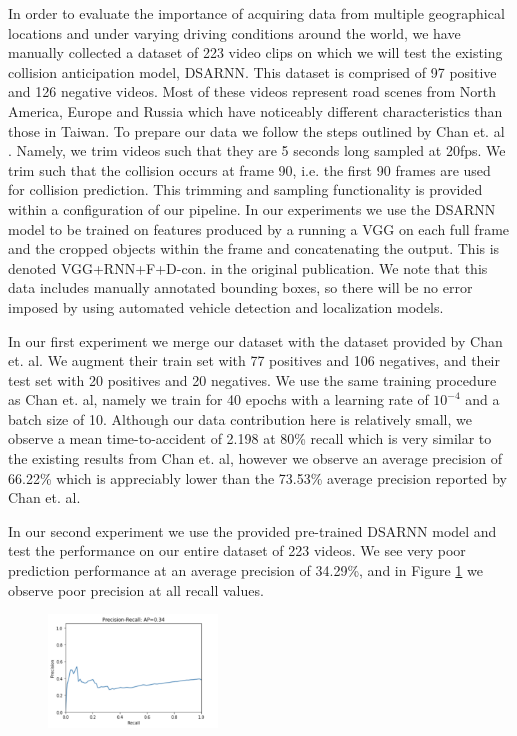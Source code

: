 \documentclass[letterpaper, 10 pt, conference]{IEEEconf}
\begin{document}
In order to evaluate the importance of acquiring data from multiple geographical locations and under varying driving conditions around the world, we have manually collected a dataset of 223 video clips on which we will test the existing collision anticipation model, DSARNN.  This dataset is comprised of 97 positive and 126 negative videos. Most of these videos represent road scenes from North America, Europe and Russia which have noticeably different characteristics than those in Taiwan. To prepare our data we follow the steps outlined by Chan et. al \cite{chan2016anticipating}. Namely, we trim videos such that they are 5 seconds long sampled at 20fps. We trim such that the collision occurs at frame 90, i.e. the first 90 frames are used for collision prediction. This trimming and sampling functionality is provided within a configuration of our pipeline. In our experiments we use the DSARNN model to be trained on features produced by a running a VGG \cite{DBLP:journals/corr/SimonyanZ14a} on each full frame and the cropped objects within the frame and concatenating the output. This is denoted VGG+RNN+F+D-con. in the original publication. We note that this data includes manually annotated bounding boxes, so there will be no error imposed by using automated vehicle detection and localization models.

In our first experiment we merge our dataset with the dataset provided by Chan et. al. We augment their train set with 77 positives and 106 negatives, and their test set with 20 positives and 20 negatives. We use the same training procedure as Chan et. al, namely we train for 40 epochs with a learning rate of $10^{-4}$ and a batch size of 10. Although our data contribution here is relatively small, we observe a mean time-to-accident of 2.198 at 80\% recall which is very similar to the existing results from Chan et. al, however we observe an average precision of 66.22\% which is appreciably lower than the 73.53\% average precision reported by Chan et. al.

In our second experiment we use the provided pre-trained DSARNN model and test the performance on our entire dataset of 223 videos. We see very poor prediction performance at an average precision of 34.29\%, and in Figure \ref{fig:pr_curve} we observe poor precision at all recall values.

\begin{figure}[htpb]
		\centering
		\includegraphics[width=0.4\textwidth]{prcurve.png}
		\caption{}
		\label{fig:pr_curve}
\end{figure}
\end{document}
